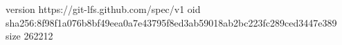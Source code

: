 version https://git-lfs.github.com/spec/v1
oid sha256:8f98f1a076b8bf49eea0a7e43795f8ed3ab59018ab2bc223fc289ced3447e389
size 262212
